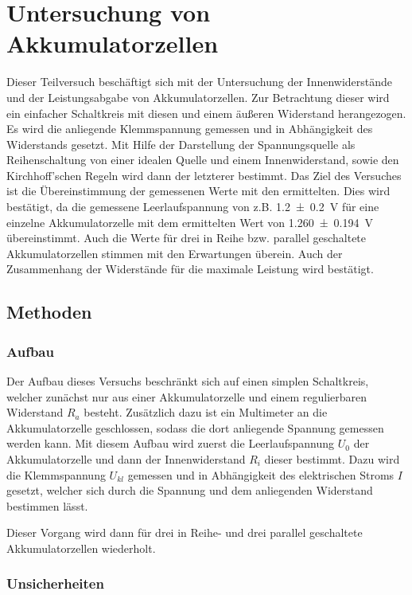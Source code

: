 \section{Untersuchung von Akkumulatorzellen} 

Dieser Teilversuch beschäftigt sich mit der Untersuchung der Innenwiderstände und der Leistungsabgabe von Akkumulatorzellen.
Zur Betrachtung dieser wird ein einfacher Schaltkreis mit diesen und einem äußeren Widerstand herangezogen.
Es wird die anliegende Klemmspannung gemessen und in Abhängigkeit des Widerstands gesetzt. 
Mit Hilfe der Darstellung der Spannungsquelle als Reihenschaltung von einer idealen Quelle und einem Innenwiderstand, sowie den Kirchhoff'schen Regeln wird dann der letzterer bestimmt. 
Das Ziel des Versuches ist die Übereinstimmung der gemessenen Werte mit den ermittelten. 
Dies wird bestätigt, da die gemessene Leerlaufspannung von z.B. \SI{1,2+-0,2}{V} für eine einzelne Akkumulatorzelle mit dem ermittelten Wert von \SI{1,260+-0,194}{V} übereinstimmt. Auch die Werte für drei in Reihe bzw. parallel geschaltete Akkumulatorzellen stimmen mit den Erwartungen überein.
Auch der Zusammenhang der Widerstände für die maximale Leistung wird bestätigt.  

\subsection{Methoden}

\subsubsection{Aufbau}

Der Aufbau dieses Versuchs beschränkt sich auf einen simplen Schaltkreis, welcher zunächst nur aus einer Akkumulatorzelle und einem regulierbaren Widerstand $R_a$ besteht. 
Zusätzlich dazu ist ein Multimeter an die Akkumulatorzelle geschlossen, sodass die dort anliegende Spannung gemessen werden kann. 
Mit diesem Aufbau wird zuerst die Leerlaufspannung $U_0$ der Akkumulatorzelle und dann der Innenwiderstand $R_i$ dieser bestimmt.
Dazu wird die Klemmspannung $U_{kl}$ gemessen und in Abhängigkeit des elektrischen Stroms $I$ gesetzt, welcher sich durch die Spannung und dem anliegenden Widerstand bestimmen lässt.

Dieser Vorgang wird dann für drei in Reihe- und drei parallel geschaltete Akkumulatorzellen wiederholt. 

\subsubsection{Unsicherheiten}

